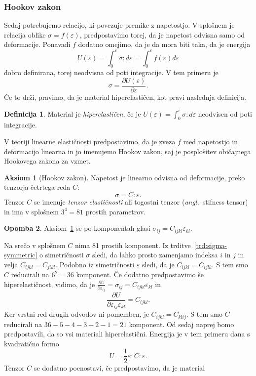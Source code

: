 \documentclass[12pt,a4paper,twoside]{article}
\theoremstyle{definition} %
\newtheorem{definicija}{Definicija}[section]
\newtheorem{opomba}[definicija]{Opomba}
\newtheorem{aksiom}{Aksiom}
\theoremstyle{plain} %
\numberwithin{equation}{section}
\newcommand{\eps}{\varepsilon}
\newcommand{\dpar}[2]{\ensuremath{\frac{\partial #1}{\partial #2}}}
\newcommand{\ts}{\sigma}
\newcommand{\ang}[1]{(\textit{angl.}\ #1)}
\begin{document}
\subsubsection{Hookov zakon}
Sedaj potrebujemo relacijo, ki povezuje premike z napetostjo.
V splošnem je relacija oblike $\ts = f(\eps)$, predpostavimo torej, da je
napetost odvisna samo od deformacije. Ponavadi $f$ dodatno omejimo, da je
da mora biti taka, da je energija
\[
  U(\eps) = \int_{0}^{\eps} \ts : d\eps = \int_0^\eps f(\eps) d\eps
\]
dobro definirana, torej neodvisna od poti integracije. V tem primeru je
\[
  \ts = \dpar{U(\eps)}{\eps}.
\]
Če to drži, pravimo, da je material hiperelastičen, kot pravi naslednja
definicija.
\begin{definicija}
  Material je \emph{hiperelastičen}, če je $U(\eps) = \int_0^\eps \ts:d\eps$ neodvisen
  od poti integracije.
\end{definicija}
V teoriji linearne elastičnosti
predpostavimo, da je zveza $f$ med napetostjo in deformacijo linearna in jo
imenujemo Hookov zakon, saj je posplošitev običajnega Hookovega zakona za vzmet.
\begin{aksiom}[Hookov zakon]
  \label{aks:hook}
  Napetost je linearno odvisna od deformacije, preko tenzorja četrtega reda $C$:
  \[ \ts = C:\eps. \]
  Tenzor $C$ se imenuje \emph{tenzor elastičnosti} ali togostni tenzor
  \ang{stifness tensor} in ima v splošnem $3^4 = 81$ prostih parametrov.
\end{aksiom}
\begin{opomba}
  Aksiom~\ref{aks:hook} se po komponentah glasi $\ts_{ij} = C_{ijkl}
  \eps_{kl}$.
\end{opomba}
Na srečo v splošnem $C$ nima 81 prostih komponent.
Iz trditve~\ref{trd:sigma-symmetric} o simetričnosti $\ts$ sledi, da lahko
prosto zamenjamo indeksa $i$ in $j$ in velja $C_{ijkl} = C_{jikl}$.
Podobno iz simetričnosti $\eps$ sledi, da je $C_{ijkl} = C_{ijlk}$.
S tem smo $C$ reducirali na $6^2 = 36$ komponent.
Če dodatno predpostavimo še hiperelastičnost, vidimo, da je $\dpar{U}{\eps_{ij}}
= \sigma_{ij} = C_{ijkl}\eps_{kl}$ in
\[
  \dpar{U}{\eps_{ij}\eps_{kl}} = C_{ijkl}.
\]
Ker vrstni red drugih odvodov ni pomemben, je $C_{ijkl} = C_{klij}$.
S tem smo $C$ reducirali na $36-5-4-3-2-1 = 21$ komponent.
Od sedaj naprej bomo predpostavili, da so vsi materiali hiperelastični.
Energija je v tem primeru dana s kvadratično formo
\begin{equation}
  U = \frac12 \eps:C:\eps.
  \label{eq:energy}
\end{equation}
Tenzor $C$ se dodatno poenostavi, če predpostavimo, da je material
\end{document}
